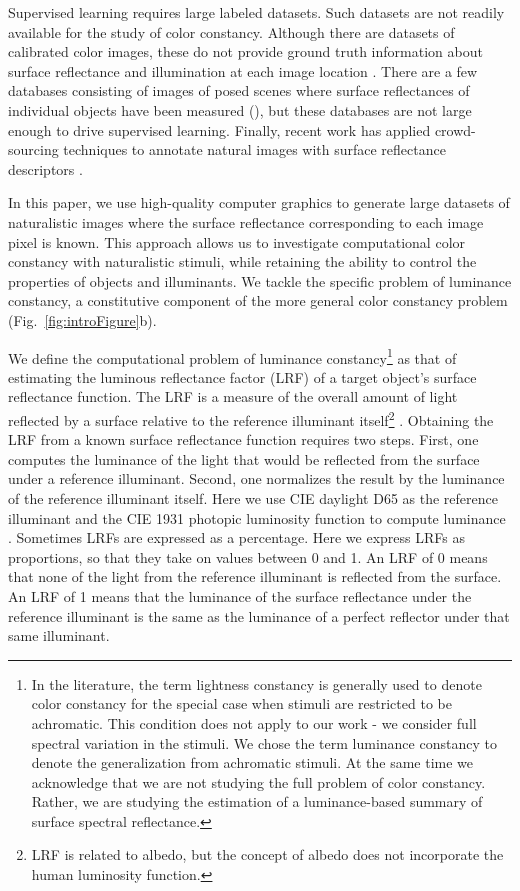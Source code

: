 \documentclass{jov}
\begin{document}
Supervised learning requires large labeled datasets. Such datasets are not readily available for the study of color constancy. Although there are datasets of calibrated color images, these do not provide ground truth information about surface reflectance and illumination at each image location \cite{ChakrabartiHyperspectral,NascimentoFoster2016,ParragaHyperspectralData,TkacikUpennHypersepctralData,skauli2013collection,olmos2004biologically}. There are a few databases consisting of images of posed scenes where surface reflectances of individual objects have been measured (), but these databases are not large enough to drive supervised learning. Finally, recent work has applied crowd-sourcing techniques to annotate natural images with surface reflectance descriptors \cite{bell2014intrinsic}.
 
In this paper, we use high-quality computer graphics to generate large datasets of naturalistic images where the surface reflectance corresponding to each image pixel is known. 
This approach allows us to investigate computational color constancy with naturalistic stimuli, while retaining the ability to control the properties of objects and illuminants. We tackle the specific problem of luminance constancy, a constitutive component of the more general color constancy problem (Fig.~\ref{fig:introFigure}b). 

We define the computational problem of luminance constancy\footnote{In the literature, the term lightness constancy is generally used to denote color constancy for the special case when stimuli are restricted to be achromatic. This condition does not apply to our work - we consider full spectral variation in the stimuli. We chose the term luminance constancy to denote the generalization from achromatic stimuli. At the same time we acknowledge that we are not studying the full problem of color constancy. Rather, we are studying the estimation of a luminance-based summary of surface spectral reflectance.} as that of estimating the luminous reflectance factor (LRF) of a target object's surface reflectance function.
The LRF is a measure of the overall amount of light reflected by a surface relative to the reference illuminant itself\footnote{LRF is related to albedo, but the concept of albedo does not incorporate the human luminosity function.} \cite{astm1121477}.
Obtaining the LRF from a known surface reflectance function requires two steps.
First, one computes the luminance of the light that would be reflected from the surface under a reference illuminant.
Second, one normalizes the result by the luminance of the reference illuminant itself.
Here we use CIE daylight D65 as the reference illuminant and the CIE 1931 photopic luminosity function to compute luminance \cite{CIE86}.
Sometimes LRFs are expressed as a percentage.
Here we express LRFs as proportions, so that they take on values between 0 and 1. 
An LRF of 0 means that none of the light from the reference illuminant is reflected from the surface. 
An LRF of 1 means that the luminance of the surface reflectance under the reference illuminant is the same as the luminance of a perfect reflector under that same illuminant.
\end{document}
